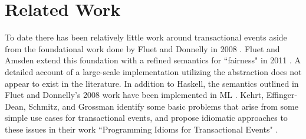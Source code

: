 \documentclass[conference, letterpaper]{IEEEtran}
\begin{document}
\section{Related Work}
To date there has been relatively little work around transactional events aside from the foundational work done by
Fluet and Donnelly in 2008 \cite{te:original}. Fluet and Amsden extend this foundation with a refined semantics  for ``fairness" in 2011 \cite{te:fairness}.
A detailed account of a large-scale implementation utilizing the abstraction does not appear to exist in the literature. 
In addition to Haskell, the semantics outlined in Fluet and Donnelly's 2008 work have been implemented in ML \cite{te:ml}. 
Kehrt, Effinger-Dean, Schmitz, and Grossman identify some basic problems that arise from some simple use cases for
transactional events, and propose idiomatic approaches to these issues in their work ``Programming Idioms for Transactional Events" \cite{te:idioms}.  



\end{document}
